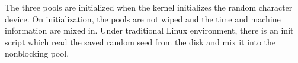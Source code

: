 The three pools are initialized when the kernel initializes the random character device. On initialization, the pools are not wiped and the time and machine information are mixed in. Under traditional Linux environment, there is an init script which read the saved random seed from the disk and mix it into the nonblocking pool.



